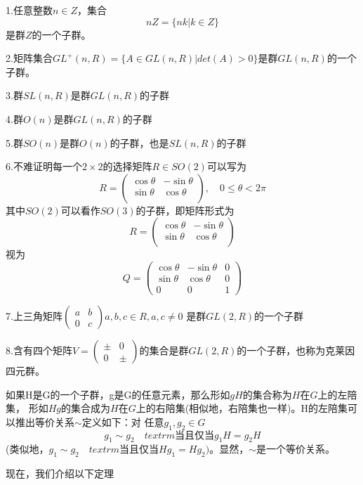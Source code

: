 \begin{example}

  1.任意整数$n\in Z$，集合
  \[
    nZ=\{nk | k \in Z\}
  \]
  是群$Z$的一个子群。

  2.矩阵集合$GL^+(n,R)=\{A\in GL(n,R)|det(A)>0\}$是群$GL(n,R)$的一个子群。

  3.群$SL(n, R)$是群$GL(n,R)$的子群

  4.群$O(n)$是群$GL(n,R)$的子群
  
  5.群$SO(n)$是群$O(n)$的子群，也是$SL(n, R)$的子群

  6.不难证明每一个$2\times 2$的选择矩阵$R\in SO(2)$可以写为
\[
R=
  \left( \begin{array}{cc}
           \cos\theta & -\sin\theta \\
           \sin\theta & \cos\theta \\
         \end{array} \right), \quad 0 \leq \theta<2\pi
\]
其中$SO(2)$可以看作$SO(3)$的子群，即矩阵形式为
\[
R=
  \left( \begin{array}{cc}
           \cos\theta & -\sin\theta \\
           \sin\theta & \cos\theta \\
         \end{array} \right)
\]
视为
\[
Q=
  \left( \begin{array}{ccc}
           \cos\theta & -\sin\theta &0 \\
           \sin\theta & \cos\theta  &0 \\
           0     & 0      &1
         \end{array} \right)
\]

 7.上三角矩阵$\left(\begin{array}{cc}
               a & b\\
               0 & c
\end{array}\right) a,b,c\in R, a,c\neq 0$
是群$GL(2,R)$的一个子群

 8.含有四个矩阵$V=\left(\begin{array}{cc}
               \pm & 0\\
               0   & \pm
\end{array}\right)$的集合是群$GL(2,R)$的一个子群，也称为克莱因四元群。
\end{example}

\begin{definition}
  如果H是G的一个子群，g是G的任意元素，那么形如$gH$的集合称为$H$在$G$上的左陪集，
  形如$Hg$的集合成为$H$在$G$上的右陪集(相似地，右陪集也一样)。H的左陪集可以推出等价关系$\sim$定义如下：对
  任意$g_1,g_2\in G$
  \[
    g_1\sim g_2 \quad textrm{当且仅当} g_1H=g_2H 
    \]
    (类似地，$g_1\sim g_2 \quad textrm{当且仅当} Hg_1=Hg_2)$。显然，$\sim$是一个等价关系。
\end{definition}
    现在，我们介绍以下定理








